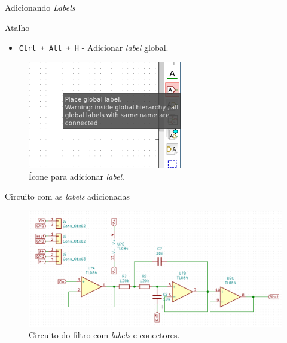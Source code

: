 \documentclass{beamer}
\begin{document}
\begin{frame}{Adicionando \textit{Labels}}
	\begin{block}{Atalho}
		\begin{itemize}
			\item \texttt{Ctrl + Alt + H} - Adicionar \textit{label} global.
		\end{itemize}
	\end{block}
	\begin{figure}
		\centering
		\includegraphics[width=0.6\textwidth]{Imagens/03_label.png}
		\caption{Ícone para adicionar \textit{label}.}
	\end{figure}
\end{frame}

\begin{frame}{Circuito com as \textit{labels} adicionadas}
	\begin{figure}
		\centering
		\includegraphics[width=1\textwidth]{Imagens/04_circ_com_label.png}
		\caption{Circuito do filtro com \textit{labels} e conectores.}
	\end{figure}
\end{frame}
\end{document}
